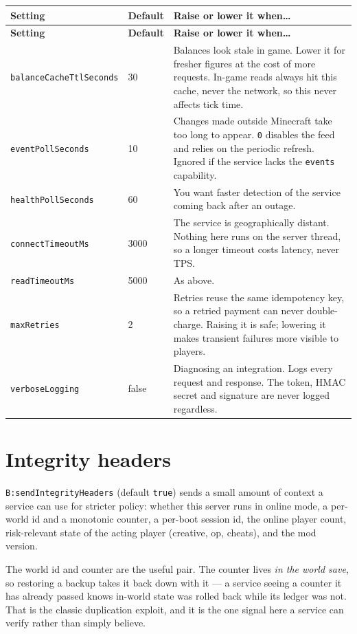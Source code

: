 \documentclass[11pt,a4paper]{article}
\newcommand{\code}[1]{\texttt{\small #1}}
\newcommand{\keybox}[2]{%
  \par\vspace{0.5em}\noindent
  \colorbox{#1}{\begin{minipage}{\dimexpr\linewidth-2\fboxsep\relax}
  \vspace{0.35em}\small #2\vspace{0.35em}\end{minipage}}\par\vspace{0.5em}}
\newcommand{\note}[1]{\keybox{omceWash}{#1}}
\begin{document}
\begin{longtable}{L{4.6cm} L{1.7cm} L{8.4cm}}
\toprule
\textbf{Setting} & \textbf{Default} & \textbf{Raise or lower it when\ldots}\\
\midrule
\endfirsthead
\toprule
\textbf{Setting} & \textbf{Default} & \textbf{Raise or lower it when\ldots}\\
\midrule
\endhead
\code{balanceCacheTtlSeconds} & 30 &
  Balances look stale in game. Lower it for fresher figures at the cost of more requests. In-game
  reads always hit this cache, never the network, so this never affects tick time.\\
\code{eventPollSeconds} & 10 &
  Changes made outside Minecraft take too long to appear. \code{0} disables the feed and relies on
  the periodic refresh. Ignored if the service lacks the \code{events} capability.\\
\code{healthPollSeconds} & 60 &
  You want faster detection of the service coming back after an outage.\\
\code{connectTimeoutMs} & 3000 &
  The service is geographically distant. Nothing here runs on the server thread, so a longer
  timeout costs latency, never TPS.\\
\code{readTimeoutMs} & 5000 & As above.\\
\code{maxRetries} & 2 &
  Retries reuse the same idempotency key, so a retried payment can never double-charge. Raising it
  is safe; lowering it makes transient failures more visible to players.\\
\code{verboseLogging} & false &
  Diagnosing an integration. Logs every request and response. The token, HMAC secret and signature
  are never logged regardless.\\
\bottomrule
\end{longtable}

\section{Integrity headers}

\code{B:sendIntegrityHeaders} (default \code{true}) sends a small amount of context a service can
use for stricter policy: whether this server runs in online mode, a per-world id and a monotonic
counter, a per-boot session id, the online player count, risk-relevant state of the acting player
(creative, op, cheats), and the mod version.

\note{The world id and counter are the useful pair. The counter lives \emph{in the world save}, so
restoring a backup takes it back down with it --- a service seeing a counter it has already passed
knows in-world state was rolled back while its ledger was not. That is the classic duplication
exploit, and it is the one signal here a service can verify rather than simply believe.}
\end{document}
